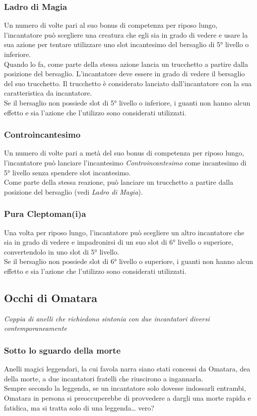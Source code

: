 \subsubsection{Ladro di Magia}
Un numero di volte pari al suo bonus di competenza per riposo lungo, l'incantatore può scegliere una creatura che egli sia in grado di vedere e usare la sua azione per tentare utilizzare uno slot incantesimo del bersaglio di 5° livello o inferiore. \\
Quando lo fa, come parte della stessa azione lancia un trucchetto a partire dalla posizione del bersaglio. L'incantatore deve essere in grado di vedere il bersaglio del suo trucchetto. Il trucchetto è considerato lanciato dall'incantatore con la sua caratteristica da incantatore. \\ Se il bersaglio non possiede slot di 5° livello o inferiore, i guanti non hanno alcun effetto e sia l'azione che l'utilizzo sono considerati utilizzati.

\subsubsection{Controincantesimo}
Un numero di volte pari a metà del suo bonus di competenza per riposo lungo, l'incantatore può lanciare l'incantesimo \textit{Controincantesimo} come incantesimo di 5° livello senza spendere slot incantesimo. \\ Come parte della stessa reazione, può lanciare un trucchetto a partire dalla posizione del bersaglio (vedi \textit{Ladro di Magia}).

\subsubsection{Pura Cleptoman(i)a}
Una volta per riposo lungo, l'incantatore può scegliere un altro incantatore che sia in grado di vedere e impadronirsi di un suo slot di 6° livello o superiore, convertendolo in uno slot di 5° livello. \\ Se il bersaglio non possiede slot di 6° livello o superiore, i guanti non hanno alcun effetto e sia l'azione che l'utilizzo sono considerati utilizzati.

\subsection{Occhi di Omatara}
\textit{Coppia di anelli che richiedono sintonia con due incantatori diversi contemporaneamente}

\subsubsection{Sotto lo sguardo della morte}
Anelli magici leggendari, la cui favola narra siano stati concessi da Omatara, dea della morte, a due incantatori fratelli che riuscirono a ingannarla. \\ Sempre secondo la leggenda, se un incantatore solo dovesse indossarli entrambi, Omatara in persona si preoccuperebbe di provvedere a dargli una morte rapida e fatidica, ma si tratta solo di una leggenda… vero? 

